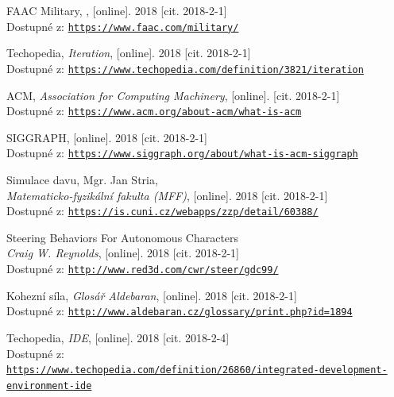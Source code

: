 \documentclass[czech,public,dept460,male,cpdeclaration]{diploma}
\begin{document}
\begin{thebibliography}{99}
	 FAAC Military,
		, [online]. 2018 [cit. 2018-2-1]\\
		Dostupné z: \href{https://www.faac.com/military/}{\texttt{https://www.faac.com/military/}}
		
	 Techopedia,
		\textit{Iteration}, [online]. 2018 [cit. 2018-2-1]\\
		Dostupné z: \href{https://www.techopedia.com/definition/3821/iteration}{\texttt{https://www.techopedia.com/definition/3821/iteration}}
		
	 ACM,
		\textit{Association for Computing Machinery}, [online]. [cit. 2018-2-1]\\
		Dostupné z: \href{https://www.acm.org/about-acm/what-is-acm}{\texttt{https://www.acm.org/about-acm/what-is-acm}}
		
	 SIGGRAPH, [online]. 2018 [cit. 2018-2-1]\\
		Dostupné z: \href{https://www.siggraph.org/about/what-is-acm-siggraph}{\texttt{https://www.siggraph.org/about/what-is-acm-siggraph}}
		
	 Simulace davu, Mgr. Jan Stria,\\
		\textit{Matematicko-fyzikální fakulta (MFF)}, [online]. 2018 [cit. 2018-2-1]\\
		Dostupné z: \href{https://is.cuni.cz/webapps/zzp/detail/60388/}{\texttt{https://is.cuni.cz/webapps/zzp/detail/60388/}}
		
	 Steering Behaviors For Autonomous Characters\\
		\textit{Craig W. Reynolds}, [online]. 2018 [cit. 2018-2-1]\\
		Dostupné z: \href{http://www.red3d.com/cwr/steer/gdc99/}{\texttt{http://www.red3d.com/cwr/steer/gdc99/}}
		
	 Kohezní síla,
		\textit{Glosář Aldebaran}, [online]. 2018 [cit. 2018-2-1]\\
		Dostupné z: \href{http://www.aldebaran.cz/glossary/print.php?id=1894}{\texttt{http://www.aldebaran.cz/glossary/print.php?id=1894}}
		
	 Techopedia,
		\textit{IDE}, [online]. 2018 [cit. 2018-2-4]\\
		Dostupné z:\\ \href{https://www.techopedia.com/definition/26860/integrated-development-environment-ide}{\texttt{https://www.techopedia.com/definition/26860/integrated-development-environment-ide}}
		

\end{thebibliography}
\end{document}
